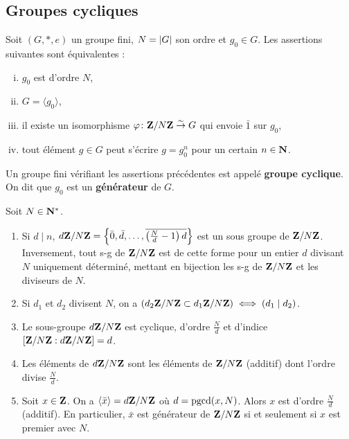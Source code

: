 \subsection{Groupes cycliques}

	\begin{pop}
		Soit $(G,*,e)$ un groupe fini, $N = \left\lvert G\right\rvert$ son ordre et $g_0 \in G$.
		Les assertions suivantes sont équivalentes :
		\begin{enumerate}[(i)]
			\item $g_0$ est d'ordre $N$,
			\item $G = \langle g_0 \rangle$,
			\item il existe un isomorphisme $\varphi \colon \mathbf{Z} / N\mathbf{Z} \overset{\sim}{\to} G$ qui envoie $\bar{1}$ sur $g_0$,
			\item tout élément $g \in G$ peut s'écrire $g = g_0^n$ pour un certain $n \in \mathbf{N}$.
		\end{enumerate}
	\end{pop}

	\begin{defn}
		Un groupe fini vérifiant les assertions précédentes est appelé \textbf{groupe cyclique}.
		On dit que $g_0$ est un \textbf{générateur} de $G$.
	\end{defn}

	\begin{pop}
		Soit $N \in \mathbf{N}^*$.
		\begin{enumerate}
			\item Si $d \mid n$, $d\mathbf{Z} / N\mathbf{Z} = \left\{ \bar{0}, \bar{d}, \ldots, \overline{\left( \frac{N}{d} - 1 \right)d} \right\}$ est un sous groupe de $\mathbf{Z} / N\mathbf{Z}$.
				Inversement, tout s-g de $\mathbf{Z} / N\mathbf{Z}$ est de cette forme pour un entier $d$ divisant $N$ uniquement déterminé, mettant en bijection les s-g de $\mathbf{Z} / N\mathbf{Z}$ et les diviseurs de $N$.
			\item Si $d_1$ et $d_2$ divisent $N$, on a $( d_2 \mathbf{Z} / N\mathbf{Z} \subset d_1 \mathbf{Z} / N\mathbf{Z} ) \iff (d_1 \mid d_2)$.
			\item Le sous-groupe $d\mathbf{Z} / N\mathbf{Z}$ est cyclique, d'ordre $\frac{N}{d}$ et d'indice $[\mathbf{Z}/N\mathbf{Z} : d\mathbf{Z}/N\mathbf{Z}] = d$.
			\item Les éléments de $d\mathbf{Z} / N\mathbf{Z}$ sont les éléments de $\mathbf{Z} / N\mathbf{Z}$ (additif) dont l'ordre divise $\frac{N}{d}$.
			\item Soit $x \in \mathbf{Z}$.
				On a $\langle \bar{x} \rangle = d\mathbf{Z} / N\mathbf{Z}$ où $d = \operatorname{pgcd}(x,N)$.
				Alors $x$ est d'ordre $\frac{N}{d}$ (additif).
				En particulier, $\bar{x}$ est générateur de $\mathbf{Z} / N\mathbf{Z}$ si et seulement si $x$ est premier avec $N$.
		\end{enumerate}
	\end{pop}

